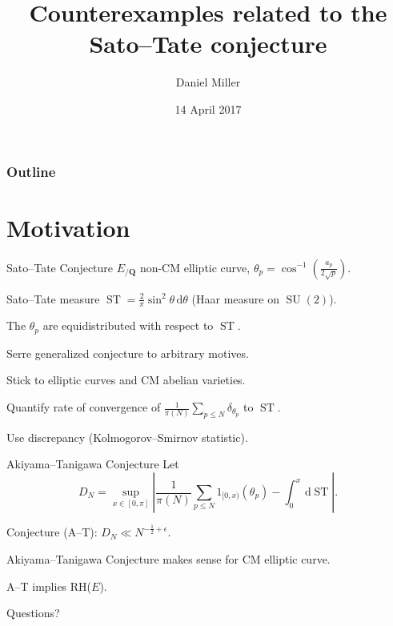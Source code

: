 \documentclass[handout]{beamer}
\title{Counterexamples related to the Sato--Tate conjecture}
\author{Daniel Miller}
\institute{Cornell University}
\date{14 April 2017}
\DeclareMathOperator{\ST}{ST}
\DeclareMathOperator{\SU}{SU}
\newcommand{\bQ}{\mathbf{Q}}
\newcommand{\dd}{\mathrm{d}}
\begin{document}
\begin{frame}
\titlepage
\end{frame}

\begin{frame}
\frametitle{Outline}
\tableofcontents
\end{frame}





\section{Motivation}

\begin{frame}{Sato--Tate Conjecture}
$E_{/\bQ}$ non-CM elliptic curve, $\theta_p = \cos^{-1}\left( \frac{a_p}{2\sqrt p}\right)$. 
\pause

Sato--Tate measure $\ST = \frac{2}{\pi} \sin^2 \theta\, \dd \theta$ (Haar 
measure on $\SU(2)$). 
\pause

\begin{theorem}[Taylor et.~al.]
The $\theta_p$ are equidistributed with respect to $\ST$. 
\end{theorem}
\pause

Serre generalized conjecture to arbitrary motives. 
\pause

Stick to elliptic curves and CM abelian varieties.
\pause

Quantify rate of convergence of 
$\frac{1}{\pi(N)} \sum_{p\leqslant N} \delta_{\theta_p}$ to $\ST$. 
\pause

Use discrepancy (Kolmogorov--Smirnov statistic). 
\end{frame}


\begin{frame}{Akiyama--Tanigawa Conjecture}
Let 
\[
	D_N = \sup_{x\in [0,\pi]}\left| \frac{1}{\pi(N)} \sum_{p\leqslant N} 1_{[0,x)}(\theta_p) - \int_0^x \, \dd\ST\right| .
\]
\pause

Conjecture (A--T): $D_N \ll N^{-\frac 1 2 + \epsilon}$. 
\pause

Akiyama--Tanigawa Conjecture makes sense for CM elliptic curve.

\begin{theorem}[A--T]
A--T implies RH($E$).
\end{theorem}
\end{frame}





\begin{frame}
\begin{center}
\Huge Questions?
\end{center}
\end{frame}
\end{document}
